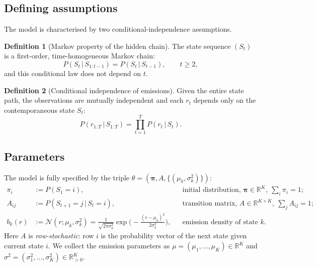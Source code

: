 \documentclass[11pt]{article}
\newcommand{\R}{\mathbb{R}}
\newcommand{\Normal}{\mathcal{N}}
\newcommand{\given}{\,\vert\,}
\newcommand{\eqdef}{:=}
\newcommand{\state}{S}
\newcommand{\obs}{r}
\newcommand{\nstate}{K}
\theoremstyle{plain}
\theoremstyle{definition}
\newtheorem{definition}{Definition}
\theoremstyle{remark}
\begin{document}
\subsection{Defining assumptions}

The model is characterised by two conditional-independence assumptions.

\begin{definition}[Markov property of the hidden chain]
The state sequence $(\state_t)$ is a first-order, time-homogeneous Markov chain:
\begin{equation}
  P(\state_t \given \state_{1:t-1}) = P(\state_t\given \state_{t-1}),
  \qquad t\ge 2,
\end{equation}
and this conditional law does not depend on $t$.
\end{definition}

\begin{definition}[Conditional independence of emissions]
Given the entire state path, the observations are mutually independent and each
$\obs_t$ depends only on the contemporaneous state $\state_t$:
\begin{equation}
  P(\obs_{1:T}\given \state_{1:T})
  = \prod_{t=1}^{T} P(\obs_t \given \state_t).
\end{equation}
\end{definition}

\subsection{Parameters}

The model is fully specified by the triple $\theta=(\bm\pi, A, \{(\mu_k,\sigma_k^2)\})$:
\begin{align}
  \pi_i        &\eqdef P(\state_1=i),
                 &&\text{initial distribution, } \bm\pi\in\R^{\nstate},\ \textstyle\sum_i\pi_i=1;\\
  A_{ij}       &\eqdef P(\state_{t+1}=j\given \state_t=i),
                 &&\text{transition matrix, } A\in\R^{\nstate\times\nstate},\ \textstyle\sum_j A_{ij}=1;\\
  b_k(\obs)    &\eqdef \Normal(\obs;\mu_k,\sigma_k^2)
                 = \frac{1}{\sqrt{2\pi\sigma_k^2}}
                   \exp\!\Big(-\tfrac{(\obs-\mu_k)^2}{2\sigma_k^2}\Big),
                 &&\text{emission density of state } k.
\end{align}
Here $A$ is \emph{row-stochastic}: row $i$ is the probability vector of the next
state given current state $i$. We collect the emission parameters as
$\mu=(\mu_1,\dots,\mu_\nstate)\in\R^{\nstate}$ and
$\sigma^2=(\sigma_1^2,\dots,\sigma_\nstate^2)\in\R_{>0}^{\nstate}$.
\end{document}
